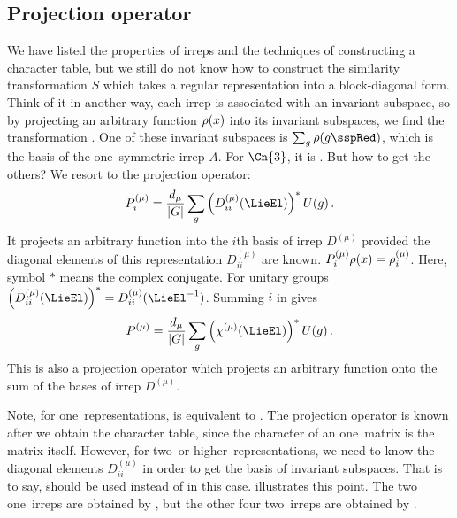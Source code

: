 
\subsection{Projection operator}
We have listed the properties of irreps and the
techniques of constructing a character table, but we still do not know how to
construct the similarity transformation $S$ which takes a regular representation into a
block-diagonal form. Think of it in another way,
each irrep is associated with an invariant subspace, so by
projecting an arbitrary function $\rho(x)$ into its invariant subspaces, we
find the transformation .
One of these invariant subspaces is $\sum_g \rho(g\sspRed)$, which is the basis of
the one\dmn\ symmetric irrep $A$. For $\Cn{3}$, it is .
But how to get the others? We resort to the projection operator:
\begin{equation}
  \label{eq:projecIrre}
  P^{(\mu)}_{i} = \frac{d_\mu}{|G|}\sum_g \left(D^{(\mu)}_{ii} (\LieEl)\right)^* U(g)
  \,.
\end{equation}
It projects an arbitrary function into the $i$th basis of irrep
$D^{(\mu)}$ provided the diagonal elements of this representation
$D^{(\mu)}_{ii}$ are known. $ P^{(\mu)}_{i} \rho(x) = \rho^{(\mu)}_i$.
Here, symbol $*$ means the complex conjugate. For unitary groups
$\left(D^{(\mu)}_{ii} (\LieEl)\right)^* = D^{(\mu)}_{ii} (\LieEl^{-1})$.
Summing $i$ in  gives
\begin{equation}
  \label{eq:projectSum}
  P^{(\mu)} = \frac{d_\mu}{|G|}\sum_g \left(\chi^{(\mu)}(\LieEl)\right)^*U(g)
  \,.
\end{equation}
This is also a projection operator which projects an arbitrary function onto
the sum of the bases of irrep $D^{(\mu)}$.

Note, for one\dmn\ representations, 
is equivalent to . The projection operator is
known after we obtain
the character table, since the character of an one\dmn\ matrix is the matrix itself.
However, for two\dmn\ or higher\dmn\ representations, we need to know the
diagonal elements $D^{(\mu)}_{ii}$ in order to get the basis of invariant subspaces. That is to say,
 should be used instead of  in this case.
 illustrates this point. The two one\dmn\ irreps are obtained
by , but the other four two\dmn\ irreps are obtained by
.

